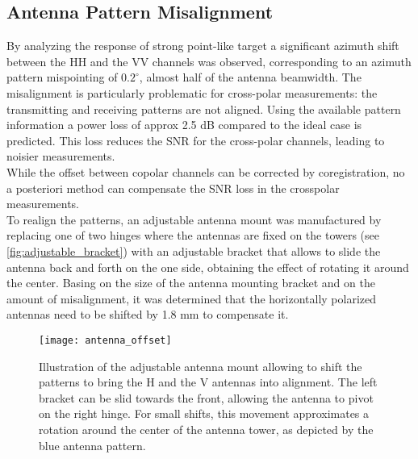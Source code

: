 \subsection{Antenna Pattern Misalignment}\label{sec:methods:misalingment}
By analyzing the response of strong point-like target a significant azimuth shift between the HH and the VV channels was observed, corresponding to an azimuth pattern mispointing of $0.2^\circ$, almost half of the antenna beamwidth.
The misalignment is particularly problematic for cross-polar measurements: the transmitting and receiving patterns are not aligned. Using the available pattern information a power loss of approx 2.5 dB  compared to the ideal case is predicted. This loss reduces the SNR for the cross-polar channels, leading to noisier measurements.\\ While the offset between copolar channels can be corrected by coregistration, no a posteriori method can compensate the SNR loss in the crosspolar measurements.\\ To realign the patterns, an adjustable antenna mount was manufactured by replacing one of two hinges where the antennas are fixed on the towers (see \autoref{fig:adjustable_bracket}) with an adjustable bracket that allows to slide the antenna back and forth on the one side, obtaining the effect of rotating it around the center. Basing on the size of the antenna mounting bracket and on the amount of misalignment, it was determined that the horizontally polarized antennas need to be shifted by 1.8 mm to compensate it.
\begin{figure}[Ht!]
	\centering
	\texttt{[image: antenna\_offset]}
	\caption{Illustration of the adjustable antenna mount allowing to shift the patterns to bring the H and the V antennas into alignment. The left bracket can be slid towards the front, allowing the antenna to pivot on the right hinge. For small shifts, this movement approximates a rotation around the center of the antenna tower, as depicted by the blue antenna pattern.}
	\label{fig:adjustable_bracket}
\end{figure}

